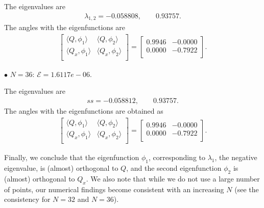 \documentclass[12pt,letterpaper]{amsart}
\theoremstyle{remark}
\numberwithin{equation}{section}
\numberwithin{theorem}{section}
\numberwithin{table}{section}
\begin{document}
The eigenvalues are
\begin{align}
\lambda_{1,2}=   -0.058808, \qquad 0.93757.
\end{align}
The angles with the eigenfunctions are
\begin{align}
\left[ \begin{matrix}
\langle Q,  \phi_1 \rangle & \langle Q, \phi_2 \rangle \\
\langle Q_x, \phi_1 \rangle & \langle Q_x, \phi_2 \rangle \\
\end{matrix} \right] = \left[ \begin{matrix}
  0.9946 &  -0.0000 \\
  0.0000 &  -0.7922 \\
\end{matrix} \right].
\end{align}

$\bullet$ \underline{\bf $N=36$}: $\mathcal{E}=1.6117e-06$. 

The eigenvalues are
\begin{align}
ss=   -0.058812, \qquad 0.93757.
\end{align}
The angles with the eigenfunctions are obtained as
\begin{align}
\left[ \begin{matrix}
\langle Q,  \phi_1 \rangle & \langle Q, \phi_2 \rangle \\
\langle Q_x, \phi_1 \rangle & \langle Q_x, \phi_2 \rangle \\
\end{matrix} \right] = \left[ \begin{matrix}
  0.9946 &  -0.0000 \\
  0.0000 &  -0.7922 \\
\end{matrix} \right].
\end{align}

Finally, we conclude that the eigenfunction $\phi_1$, corresponding to 
$\lambda_1$, the negative eigenvalue, is (almost) orthogonal to $Q$, and the second eigenfunction $\phi_2$ is (almost) orthogonal to $Q_x$. 
We also note that while we do not use a large number of points, our numerical findings become consistent with an increasing $N$ (see the consistency for $N=32$ and $N=36$).
\end{document}
